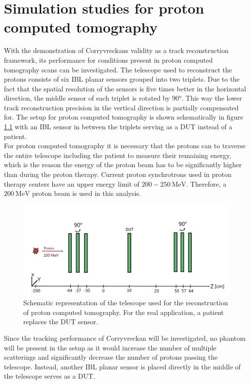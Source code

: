 \chapter{Simulation studies for proton computed tomography} \label{sec:setup}
With the demonstration of Corryvreckans validity as a track reconstruction framework, its performance for conditions present
in proton computed tomography scans can be investigated. The telescope used to reconstruct the protons consists of six IBL planar sensors
grouped into two triplets. Due to the fact that the spatial resolution of the sensors is five times better in the horizontal direction, the middle sensor
of each triplet is rotated by 90°. This way the lower track reconstruction precision in the vertical direction is partially compensated for.
The setup for proton computed tomography is shown schematically in figure \ref{fig:phantom} with an IBL sensor in between the triplets serving as a DUT instead of a patient. \\
For proton computed tomography it is necessary that the protons can to traverse the entire telescope including the patient
to measure their remaining energy, which is the reason the energy of the proton beam has to be significantly higher than during
the proton therapy. Current proton synchrotrons used in proton therapy centers have an upper energy limit of $200 - \SI{250}{\mega\eV}$.
Therefore, a $\SI{200}{\mega\eV}$ proton beam is used in this analysis.

\begin{figure}
  \centering
  \includegraphics[height=0.45\textwidth]{images/phantom_proton_4.jpg}
  \caption{Schematic representation of the telescope used for the reconstruction of proton computed tomography. For the real
  application, a patient replaces the DUT sensor.}
  \label{fig:phantom}
\end{figure}

Since the tracking performance of Corryvreckan will be investigated, no
phantom will be present in the setup as it would
increase the number of multiple scatterings and significantly decrease the number of protons passing the telescope. Instead, another
IBL planar sensor is placed directly in the middle of the telescope serves as a DUT.

